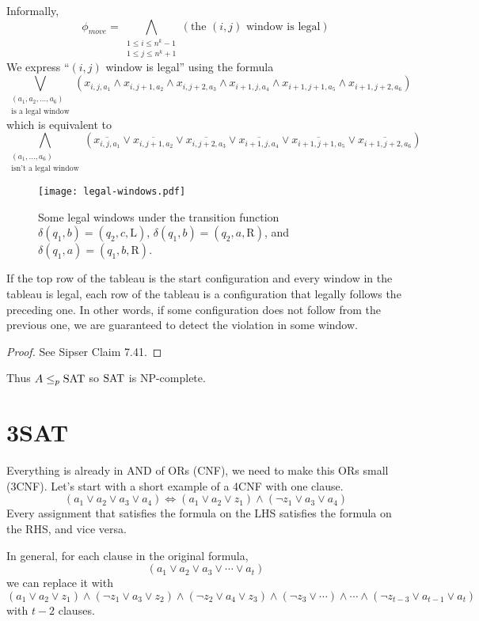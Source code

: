 Informally,
$$
\phi_{move} = \bigwedge_{\substack{1 \leq i \leq n^k - 1 \\ 1 \leq j \leq n^k + 1}} \left( \text{the $(i,j)$ window is legal} \right) 
$$
We express ``$(i,j)$ window is legal'' using the formula
$$
\bigvee_{\substack{(a_1,a_2,\ldots,a_6) \\ \text{is a legal window}}} \left( x_{i,j,a_1} \land x_{i,j+1,a_2} \land x_{i,j+2,a_3} \land x_{i+1,j,a_4} \land x_{i+1,j+1,a_5} \land x_{i+1,j+2,a_6} \right) 
$$
which is equivalent to
$$
\bigwedge_{\substack{(a_1,\ldots,a_6) \\ \text{isn't a legal window}}} \left( \overline{x_{i,j,a_1}} \lor \overline{x_{i,j+1,a_2}} \lor \overline{x_{i,j+2,a_3}} \lor \overline{x_{i+1,j,a_4}} \lor \overline{x_{i+1,j+1,a_5}} \lor \overline{x_{i+1,j+2,a_6}} \right) 
$$

\begin{figure}[htbp]
    \centering
    \texttt{[image: legal-windows.pdf]}
    \caption{Some legal windows under the transition function $\delta(q_1,b) = (q_2,c,\mathrm{L})$, $\delta(q_1,b) = (q_2,a,\mathrm{R})$, and $\delta(q_1,a) = (q_1,b,\mathrm{R})$.  }
    \label{fig:cook-levin-legal-windows}
\end{figure}

\begin{lemma}
    If the top row of the tableau is the start configuration and every window in the tableau is legal, each row of the tableau is a configuration that legally follows the preceding one. In other words, if some configuration does not follow from the previous one, we are guaranteed to detect the violation in some window.
\end{lemma}

\begin{proof}
    See Sipser Claim 7.41.
\end{proof}

Thus $A \leq_p \mathrm{SAT}$ so $\mathrm{SAT}$ is NP-complete.

\section{3SAT}

Everything is already in AND of ORs (CNF), we need to make this ORs small (3CNF). Let's start with a short example of a 4CNF with one clause.
$$
(a_1 \lor a_2 \lor a_3 \lor a_4) \iff (a_1 \lor a_2 \lor z_1) \land (\neg z_1 \lor a_3 \lor a_4)
$$
Every assignment that satisfies the formula on the LHS satisfies the formula on the RHS, and vice versa.

In general, for each clause in the original formula,
$$
(a_1 \lor a_2 \lor a_3 \lor \cdots \lor a_t)
$$
we can replace it with
$$
(a_1 \lor a_2 \lor z_1) \land (\neg z_1 \lor a_3 \lor z_2) \land (\neg z_2 \lor a_4 \lor z_3) \land (\neg z_3 \lor \cdots) \land \cdots \land (\neg z_{t-3} \lor a_{t-1} \lor a_{t})
$$
with $t-2$ clauses.